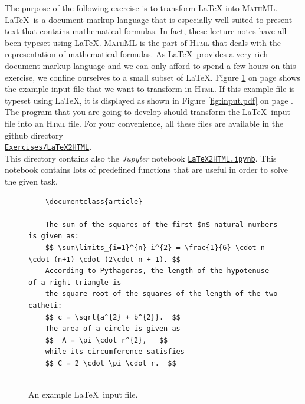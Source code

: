 \exerciseEng
The purpose of the following exercise is to transform \href{http://www.latex-project.org}{\LaTeX} into 
\href{https://www.tutorialspoint.com/mathml/index.htm}{\textsc{MathML}}.  \LaTeX\ is a document markup language
that is especially well suited to present text that contains mathematical formulas.  In fact, these
lecture notes have all been typeset using \LaTeX.  \textsc{MathML} is the part of \textsc{Html} that
deals with the representation of mathematical formulas.  As \LaTeX\ provides a very rich
document markup language and we can only afford to spend a few hours on this exercise, we confine
ourselves to a small subset of \LaTeX.  Figure \ref{fig:input.tex} on page \pageref{fig:input.tex}
shows the example input file that we want to transform in \textsc{Html}.  If this example file is
typeset using \LaTeX, it is displayed as shown in Figure \ref{fig:input.pdf} on page
\pageref{fig:input.pdf}.  The program that you are
going to develop should transform the \LaTeX\ input file into an \textsc{Html} file.  For your
convenience, all these files are available in the github directory 
\\[0.2cm]
\hspace*{1.3cm}
\href{https://github.com/karlstroetmann/Formal-Languages/tree/master/Exercises/LaTeX2HTML}{\texttt{Exercises/LaTeX2HTML}}.
\\[0.2cm]
This directory contains also the \textsl{Jupyter} notebook 
\href{https://github.com/karlstroetmann/Formal-Languages/tree/master/Exercises/LaTeX2HTML/LaTeX2HTML.ipynb}{\texttt{LaTeX2HTML.ipynb}}.
This notebook contains lots of predefined functions that are useful in order to solve the given task.

\begin{figure}[!ht]
  \centering
\begin{verbatim}
    \documentclass{article}
    
    The sum of the squares of the first $n$ natural numbers is given as:
    $$ \sum\limits_{i=1}^{n} i^{2} = \frac{1}{6} \cdot n \cdot (n+1) \cdot (2\cdot n + 1). $$
    According to Pythagoras, the length of the hypotenuse of a right triangle is
    the square root of the squares of the length of the two catheti:
    $$ c = \sqrt{a^{2} + b^{2}}.  $$
    The area of a circle is given as 
    $$  A = \pi \cdot r^{2},   $$ 
    while its circumference satisfies
    $$ C = 2 \cdot \pi \cdot r.  $$
    
    \end{verbatim}
  \caption{An example \LaTeX\ input file.}
  \label{fig:input.tex}
\end{figure}

